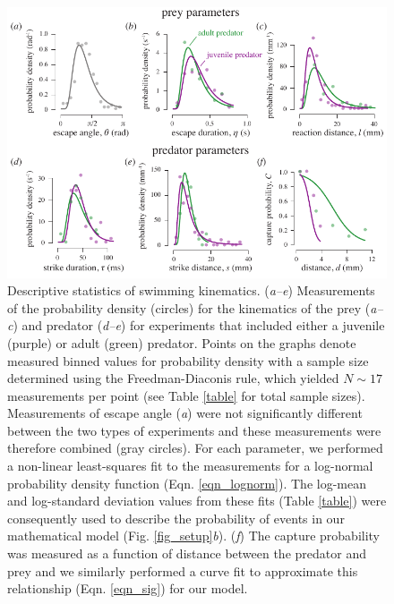 \documentclass[]{rsos}%
\begin{document}
\begin{figure}[!h]
\centering
	\includegraphics[width=5.5in]{fig_PDFs}
\caption{
Descriptive statistics of swimming kinematics. 
(\textit{a--e}) Measurements of the probability density (circles) for the kinematics of the prey (\textit{a--c}) and predator (\textit{d--e}) for experiments that included either a juvenile (purple) or adult (green) predator.
Points on the graphs denote measured binned values for probability density with a sample size determined using the Freedman-Diaconis rule, which yielded $N \sim 17$ measurements per point (see Table \ref{table} for total sample sizes).
Measurements of escape angle (\textit{a}) were not significantly different between the two types of experiments and these measurements were therefore combined (gray circles).
For each parameter, we performed a non-linear least-squares fit to the measurements for a log-normal probability density function (Eqn. \ref{eqn_lognorm}).
The log-mean and log-standard deviation values from these fits (Table \ref{table}) were consequently used to describe the probability of events in our mathematical model (Fig. \ref{fig_setup}\textit{b}).
(\textit{f}) The capture probability was measured as a function of distance between the predator and prey and we similarly performed a curve fit to approximate this relationship (Eqn. \ref{eqn_sig}) for our model. 
}
\label{fig_PDF}
\end{figure}

\pagebreak
\end{document}
